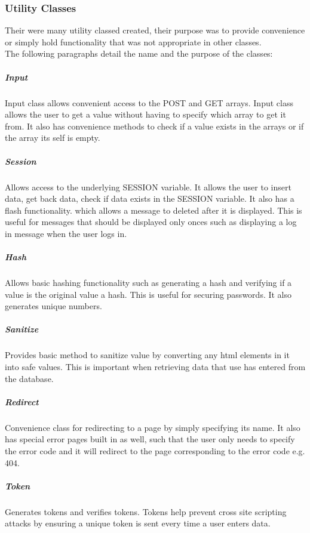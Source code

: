 \documentclass[a4paper,oneside,11pt]{report}
\begin{document}
\subsubsection{Utility Classes}
Their were many utility classed created, their purpose was to provide convenience or simply hold functionality that was not appropriate in other classes.
\\
The following paragraphs detail the name and the purpose of the classes: 
\subparagraph{Input}
Input class allows convenient access to the POST and GET arrays. Input class allows the user to get a value without having to specify which array to get it from. It also has convenience methods to check if a value exists in the arrays or if the array its self is empty. 
\subparagraph{Session}
Allows access to the underlying SESSION variable. It allows the user to insert data, get back data, check if data exists in the SESSION variable. It also has a flash functionality. which allows a message to deleted after it is displayed. This is useful for messages that should be displayed only onces such as displaying a log in message when the user logs in.
\subparagraph{Hash}
Allows basic hashing functionality such as generating a hash and verifying if a value is the original value a hash. This is useful for securing passwords. It also generates unique numbers.
\subparagraph{Sanitize}
Provides basic method to sanitize value by converting any html elements in it into safe values. This is important when retrieving data that use has entered from the database.
\subparagraph{Redirect}
Convenience class for redirecting to a page by simply specifying its name. It also has special error pages built in as well, such that the user only needs to specify the error code and it will redirect to the page corresponding to the error code e.g. 404.
\subparagraph{Token}
Generates tokens and verifies tokens. Tokens help prevent cross site scripting attacks by ensuring a unique token is sent every time a user enters data.
\end{document}
